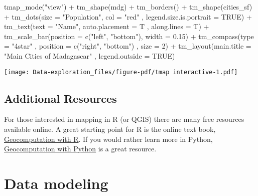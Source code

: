 \documentclass[
  letterpaper,
  DIV=11,
  numbers=noendperiod]{scrreprt}
\newenvironment{Shaded}{\begin{snugshade}}{\end{snugshade}}
\newcommand{\AttributeTok}[1]{\textcolor[rgb]{0.40,0.45,0.13}{#1}}
\newcommand{\ConstantTok}[1]{\textcolor[rgb]{0.56,0.35,0.01}{#1}}
\newcommand{\DecValTok}[1]{\textcolor[rgb]{0.68,0.00,0.00}{#1}}
\newcommand{\FloatTok}[1]{\textcolor[rgb]{0.68,0.00,0.00}{#1}}
\newcommand{\FunctionTok}[1]{\textcolor[rgb]{0.28,0.35,0.67}{#1}}
\newcommand{\NormalTok}[1]{\textcolor[rgb]{0.00,0.23,0.31}{#1}}
\newcommand{\SpecialCharTok}[1]{\textcolor[rgb]{0.37,0.37,0.37}{#1}}
\newcommand{\StringTok}[1]{\textcolor[rgb]{0.13,0.47,0.30}{#1}}
\begin{document}
\begin{Shaded}
\begin{Highlighting}[]
\FunctionTok{tmap\_mode}\NormalTok{(}\StringTok{"view"}\NormalTok{) }\SpecialCharTok{+}
  \FunctionTok{tm\_shape}\NormalTok{(mdg) }\SpecialCharTok{+}
  \FunctionTok{tm\_borders}\NormalTok{() }\SpecialCharTok{+}
  \FunctionTok{tm\_shape}\NormalTok{(cities\_sf) }\SpecialCharTok{+}
  \FunctionTok{tm\_dots}\NormalTok{(}\AttributeTok{size =} \StringTok{"Population"}\NormalTok{, }\AttributeTok{col =} \StringTok{"red"}
\NormalTok{          , }\AttributeTok{legend.size.is.portrait =} \ConstantTok{TRUE}\NormalTok{) }\SpecialCharTok{+}
  \FunctionTok{tm\_text}\NormalTok{(}\AttributeTok{text =} \StringTok{"Name"}\NormalTok{, }\AttributeTok{auto.placement =}\NormalTok{ T}
\NormalTok{          , }\AttributeTok{along.lines =}\NormalTok{ T) }\SpecialCharTok{+}
  \FunctionTok{tm\_scale\_bar}\NormalTok{(}\AttributeTok{position =} \FunctionTok{c}\NormalTok{(}\StringTok{"left"}\NormalTok{, }\StringTok{"bottom"}\NormalTok{), }\AttributeTok{width =} \FloatTok{0.15}\NormalTok{) }\SpecialCharTok{+}
  \FunctionTok{tm\_compass}\NormalTok{(}\AttributeTok{type =} \StringTok{"4star"}
\NormalTok{             , }\AttributeTok{position =} \FunctionTok{c}\NormalTok{(}\StringTok{"right"}\NormalTok{, }\StringTok{"bottom"}\NormalTok{)}
\NormalTok{             , }\AttributeTok{size =} \DecValTok{2}\NormalTok{) }\SpecialCharTok{+}
  \FunctionTok{tm\_layout}\NormalTok{(}\AttributeTok{main.title =} \StringTok{"Main Cities of Madagascar"}\NormalTok{                         , }\AttributeTok{legend.outside =} \ConstantTok{TRUE}\NormalTok{)}
\end{Highlighting}
\end{Shaded}

\texttt{[image: Data-exploration\_files/figure-pdf/tmap interactive-1.pdf]}

\section{Additional Resources}\label{additional-resources}

For those interested in mapping in R (or QGIS) there are many free
resources available online. A great starting point for R is the online
text book, \href{https://r.geocompx.org/}{Geocomputation with R}. If you
would rather learn more in Python,
\href{https://py.geocompx.org/}{Geocomputation with Python} is a great
resource.

\chapter{Data modeling}\label{data-modeling}
\end{document}

